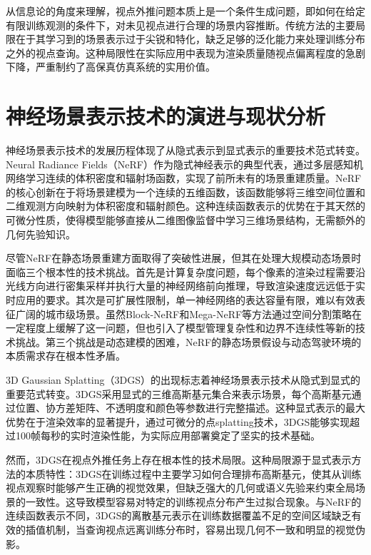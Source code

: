 从信息论的角度来理解，视点外推问题本质上是一个条件生成问题，即如何在给定有限训练观测的条件下，对未见视点进行合理的场景内容推断。传统方法的主要局限在于其学习到的场景表示过于尖锐和特化，缺乏足够的泛化能力来处理训练分布之外的视点查询。这种局限性在实际应用中表现为渲染质量随视点偏离程度的急剧下降，严重制约了高保真仿真系统的实用价值。

\section{神经场景表示技术的演进与现状分析}

神经场景表示技术的发展历程体现了从隐式表示到显式表示的重要技术范式转变。Neural Radiance Fields（NeRF）作为隐式神经表示的典型代表，通过多层感知机网络学习连续的体积密度和辐射场函数，实现了前所未有的场景重建质量\cite{mildenhall2021nerf}。NeRF的核心创新在于将场景建模为一个连续的五维函数，该函数能够将三维空间位置和二维观测方向映射为体积密度和辐射颜色。这种连续函数表示的优势在于其天然的可微分性质，使得模型能够直接从二维图像监督中学习三维场景结构，无需额外的几何先验知识。

尽管NeRF在静态场景重建方面取得了突破性进展，但其在处理大规模动态场景时面临三个根本性的技术挑战。首先是计算复杂度问题，每个像素的渲染过程需要沿光线方向进行密集采样并执行大量的神经网络前向推理，导致渲染速度远远低于实时应用的要求。其次是可扩展性限制，单一神经网络的表达容量有限，难以有效表征广阔的城市级场景。虽然Block-NeRF和Mega-NeRF等方法通过空间分割策略在一定程度上缓解了这一问题，但也引入了模型管理复杂性和边界不连续性等新的技术挑战\cite{blocknerf2022,meganeRF2022}。第三个挑战是动态建模的困难，NeRF的静态场景假设与动态驾驶环境的本质需求存在根本性矛盾。

3D Gaussian Splatting（3DGS）的出现标志着神经场景表示技术从隐式到显式的重要范式转变\cite{kerbl2023gaussian}。3DGS采用显式的三维高斯基元集合来表示场景，每个高斯基元通过位置、协方差矩阵、不透明度和颜色等参数进行完整描述。这种显式表示的最大优势在于渲染效率的显著提升，通过可微分的点splatting技术，3DGS能够实现超过100帧每秒的实时渲染性能，为实际应用部署奠定了坚实的技术基础。

然而，3DGS在视点外推任务上存在根本性的技术局限。这种局限源于显式表示方法的本质特性：3DGS在训练过程中主要学习如何合理排布高斯基元，使其从训练视点观察时能够产生正确的视觉效果，但缺乏强大的几何或语义先验来约束全局场景的一致性。这导致模型容易对特定的训练视点分布产生过拟合现象。与NeRF的连续函数表示不同，3DGS的离散基元表示在训练数据覆盖不足的空间区域缺乏有效的插值机制，当查询视点远离训练分布时，容易出现几何不一致和明显的视觉伪影。

